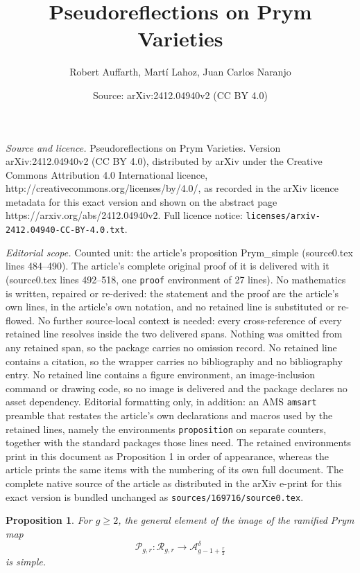 \documentclass[10pt,a4paper]{amsart}
\title{Pseudoreflections on Prym Varieties}
\author{Robert Auffarth, Mart\'i Lahoz, Juan Carlos Naranjo}
\date{Source: arXiv:2412.04940v2 (CC BY 4.0)}
\newtheorem{proposition}{Proposition}
\def\cA{\ensuremath{\mathcal{A}}}
\def\cP{\ensuremath{\mathcal{P}}}
\def\cR{\ensuremath{\mathcal{R}}}
\begin{document}
\maketitle

\noindent\emph{Source and licence.} Pseudoreflections on Prym Varieties. Version arXiv:2412.04940v2 (CC BY 4.0), distributed by arXiv under the Creative Commons Attribution 4.0 International licence, http://creativecommons.org/licenses/by/4.0/, as recorded in the arXiv licence metadata for this exact version and shown on the abstract page https://arxiv.org/abs/2412.04940v2. Full licence notice: \texttt{licenses/arxiv-2412.04940-CC-BY-4.0.txt}.\par\smallskip

\noindent\textit{Editorial scope.} Counted unit: the article's proposition Prym\_simple (source0.tex lines 484--490). The article's complete original proof of it is delivered with it (source0.tex lines 492--518, one \texttt{proof} environment of 27 lines). No mathematics is written, repaired or re-derived: the statement and the proof are the article's own lines, in the article's own notation, and no retained line is substituted or re-flowed.  No further source-local context is needed: every cross-reference of every retained line resolves inside the two delivered spans.  Nothing was omitted from any retained span, so the package carries no omission record.  No retained line contains a citation, so the wrapper carries no bibliography and no bibliography entry.  No retained line contains a figure environment, an image-inclusion command or drawing code, so no image is delivered and the package declares no asset dependency.  Editorial formatting only, in addition: an AMS \texttt{amsart} preamble that restates the article's own declarations and macros used by the retained lines, namely the environments \texttt{proposition} on separate counters, together with the standard packages those lines need.  The retained environments print in this document as Proposition 1 in order of appearance, whereas the article prints the same items with the numbering of its own full document.  The complete native source of the article as distributed in the arXiv e-print for this exact version is bundled unchanged as \texttt{sources/169716/source0.tex}.
\begin{proposition}\label{Prym_simple} 
For $g\geq 2$, the general element of the image of the ramified Prym map
\[
\cP^{}_{g,r}: \cR^{}_{g,r} \to \cA^{\delta }_{g-1+\frac r2}
\]
is simple.
\end{proposition}
\end{document}
